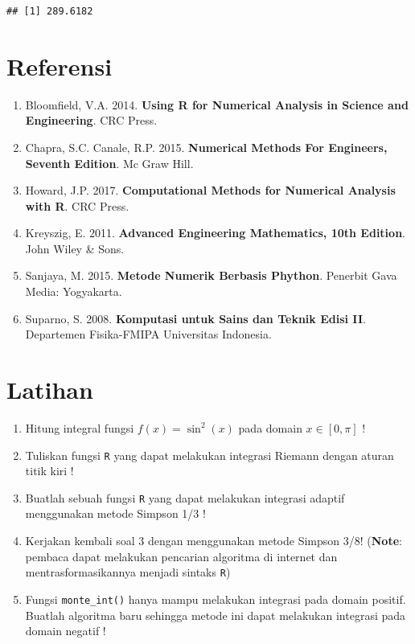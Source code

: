 \documentclass[]{book}
\providecommand{\tightlist}{%
  \setlength{\itemsep}{0pt}\setlength{\parskip}{0pt}}
\theoremstyle{definition}
\theoremstyle{definition}
\theoremstyle{definition}
\theoremstyle{remark}
\begin{document}
\begin{verbatim}
## [1] 289.6182
\end{verbatim}

\hypertarget{referensi-8}{%
\section{Referensi}\label{referensi-8}}

\begin{enumerate}
\def\labelenumi{\arabic{enumi}.}
\tightlist
\item
  Bloomfield, V.A. 2014. \textbf{Using R for Numerical Analysis in Science and Engineering}. CRC Press.
\item
  Chapra, S.C. Canale, R.P. 2015. \textbf{Numerical Methods For Engineers, Seventh Edition}. Mc Graw Hill.
\item
  Howard, J.P. 2017. \textbf{Computational Methods for Numerical Analysis with R}. CRC Press.
\item
  Kreyszig, E. 2011. \textbf{Advanced Engineering Mathematics, 10th Edition}. John Wiley \& Sons.
\item
  Sanjaya, M. 2015. \textbf{Metode Numerik Berbasis Phython}. Penerbit Gava Media: Yogyakarta.
\item
  Suparno, S. 2008. \textbf{Komputasi untuk Sains dan Teknik Edisi II}. Departemen Fisika-FMIPA Universitas Indonesia.
\end{enumerate}

\hypertarget{latihan-3}{%
\section{Latihan}\label{latihan-3}}

\begin{enumerate}
\def\labelenumi{\arabic{enumi}.}
\tightlist
\item
  Hitung integral fungsi \(f\left(x\right)=\sin^2\left(x\right)\) pada domain \(x \in \left[0,\pi\right]\) !
\item
  Tuliskan fungsi \texttt{R} yang dapat melakukan integrasi Riemann dengan aturan titik kiri !
\item
  Buatlah sebuah fungsi \texttt{R} yang dapat melakukan integrasi adaptif menggunakan metode Simpson 1/3 !
\item
  Kerjakan kembali soal 3 dengan menggunakan metode Simpson 3/8! (\textbf{Note}: pembaca dapat melakukan pencarian algoritma di internet dan mentrasformasikannya menjadi sintaks \texttt{R})
\item
  Fungsi \texttt{monte\_int()} hanya mampu melakukan integrasi pada domain positif. Buatlah algoritma baru sehingga metode ini dapat melakukan integrasi pada domain negatif !
\end{enumerate}
\end{document}
